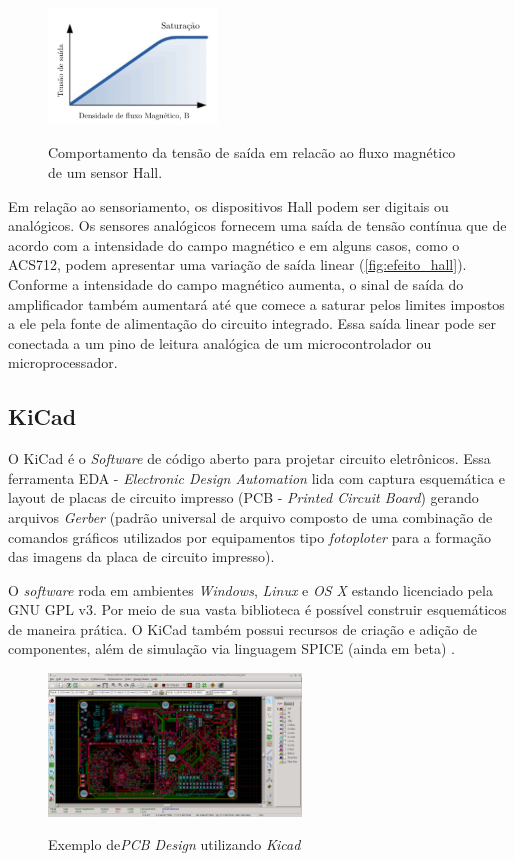 \begin{figure}[H]
	\centering
	\caption{Comportamento da tensão de saída em relacão ao fluxo magnético de um sensor Hall.}
	\includegraphics[width=0.4\textwidth]{figuras/grafico_hall.jpg}
	\label{fig:efeito_hall}
\end{figure} 

Em relação ao sensoriamento, os dispositivos Hall podem ser digitais ou analógicos. Os sensores analógicos fornecem uma saída de tensão contínua que de acordo com a intensidade do campo magnético e em alguns casos, como o ACS712, podem apresentar uma variação de saída linear (\autoref{fig:efeito_hall}). Conforme a intensidade do campo magnético aumenta, o sinal de saída do amplificador também aumentará até que comece a saturar pelos limites impostos a ele pela fonte de alimentação do circuito integrado. Essa saída linear pode ser conectada a um pino de leitura analógica de um microcontrolador ou microprocessador.

\subsection{KiCad}

O KiCad é o \textit{Software} de código aberto para projetar circuito eletrônicos. Essa ferramenta EDA - \textit{Electronic Design Automation} lida com captura esquemática e layout de placas de circuito impresso (PCB - \textit{Printed Circuit Board}) gerando arquivos \textit{Gerber} (padrão universal de arquivo composto de uma combinação de comandos gráficos utilizados por equipamentos tipo \textit{fotoploter} para a formação das imagens da placa de circuito impresso).

O \textit{software} roda em ambientes \textit{Windows}, \textit{Linux} e \textit{OS X} estando licenciado pela GNU GPL v3. Por meio de sua vasta biblioteca é possível construir esquemáticos de maneira prática. O KiCad também possui recursos de criação e adição de componentes, além de simulação via linguagem SPICE (ainda em beta) \cite{Kicad}. 

\begin{figure}[H]
	\centering
	\caption{Exemplo de\textit{PCB Design} utilizando \textit{Kicad}}
	\includegraphics[width=0.6\textwidth]{figuras/kicad_pcbnew.png}
	\label{fig:kicad_pcbnew}
\end{figure} 

